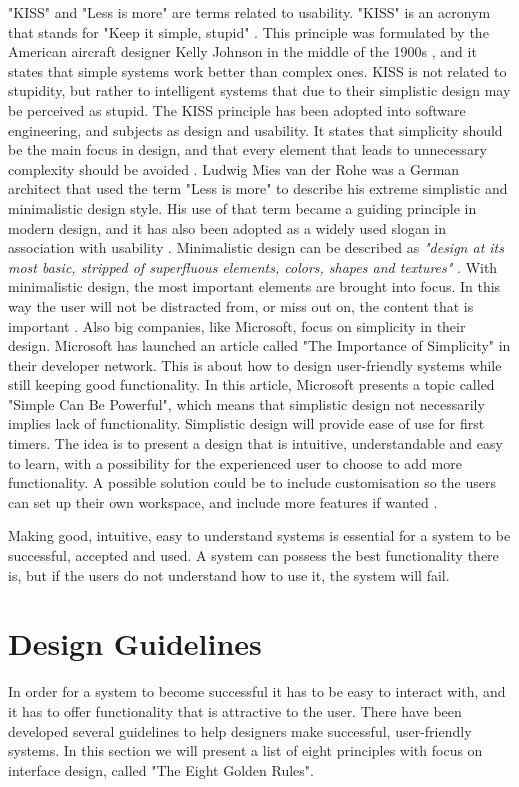 "KISS" and "Less is more" are terms related to usability. "KISS" is an acronym that stands for "Keep it simple, stupid" \cite{kiss2}. This principle was formulated by the American aircraft designer Kelly Johnson in the middle of the 1900s \cite{kiss1}, and it states that simple systems work better than complex ones. KISS is not related to stupidity, but rather to intelligent systems that due to their simplistic design may be perceived as stupid. The KISS principle has been adopted into software engineering, and subjects as design and usability. It states that simplicity should be the main focus in design, and that every element that leads to unnecessary complexity should be avoided \cite{kiss2}. Ludwig Mies van der Rohe was a German architect that used the term "Less is more" to describe his extreme simplistic and minimalistic design style. His use of that term became a guiding principle in modern design, and it has also been adopted as a widely used slogan in association with usability \cite{rohe}. Minimalistic design can be described as \emph{"design at its most basic, stripped of superfluous elements, colors, shapes and textures"} \cite{lessismore}. With minimalistic design, the most important elements are brought into focus. In this way the user will not be distracted from, or miss out on, the content that is important \cite{lessismore}. Also big companies, like Microsoft, focus on simplicity in their design. Microsoft has launched an article called "The Importance of Simplicity" in their developer network. This is about how to design user-friendly systems while still keeping good functionality. In this article, Microsoft presents a topic called "Simple Can Be Powerful", which means that simplistic design not necessarily implies lack of functionality. Simplistic design will provide ease of use for first timers. The idea is to present a design that is intuitive, understandable and easy to learn, with a possibility for the experienced user to choose to add more functionality. A possible solution could be to include customisation so the users can set up their own workspace, and include more features if wanted \cite{msdnsimple}.      

Making good, intuitive, easy to understand systems is essential for a system to be successful, accepted and used. A system can possess the best functionality there is, but if the users do not understand how to use it, the system will fail.      
    
\section{Design Guidelines}
\label{sec:designguide}
In order for a system to become successful it has to be easy to interact with, and it has to offer functionality that is attractive to the user. There have been developed several guidelines to help designers make successful, user-friendly systems. In this section we will present a list of eight principles with focus on interface design, called "The Eight Golden Rules". 

